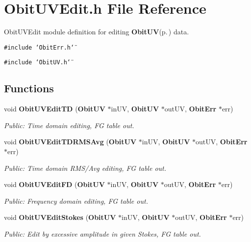 \section{Obit\-UVEdit.h File Reference}
\label{ObitUVEdit_8h}
Obit\-UVEdit module definition for editing {\bf Obit\-UV}{\rm (p.\,\pageref{structObitUV})} data. 

{\tt \#include \char`\"{}Obit\-Err.h\char`\"{}}\par
{\tt \#include \char`\"{}Obit\-UV.h\char`\"{}}\par
\subsection*{Functions}
\begin{CompactItemize}
\item 
void {\bf Obit\-UVEdit\-TD} ({\bf Obit\-UV} $\ast$in\-UV, {\bf Obit\-UV} $\ast$out\-UV, {\bf Obit\-Err} $\ast$err)
\begin{CompactList}\small\item\em Public: Time domain editing, FG table out. \item\end{CompactList}\item 
void {\bf Obit\-UVEdit\-TDRMSAvg} ({\bf Obit\-UV} $\ast$in\-UV, {\bf Obit\-UV} $\ast$out\-UV, {\bf Obit\-Err} $\ast$err)
\begin{CompactList}\small\item\em Public: Time domain RMS/Avg editing, FG table out. \item\end{CompactList}\item 
void {\bf Obit\-UVEdit\-FD} ({\bf Obit\-UV} $\ast$in\-UV, {\bf Obit\-UV} $\ast$out\-UV, {\bf Obit\-Err} $\ast$err)
\begin{CompactList}\small\item\em Public: Frequency domain editing, FG table out. \item\end{CompactList}\item 
void {\bf Obit\-UVEdit\-Stokes} ({\bf Obit\-UV} $\ast$in\-UV, {\bf Obit\-UV} $\ast$out\-UV, {\bf Obit\-Err} $\ast$err)
\begin{CompactList}\small\item\em Public: Edit by excessive amplitude in given Stokes, FG table out. \item\end{CompactList}\item 

\end{CompactItemize}

